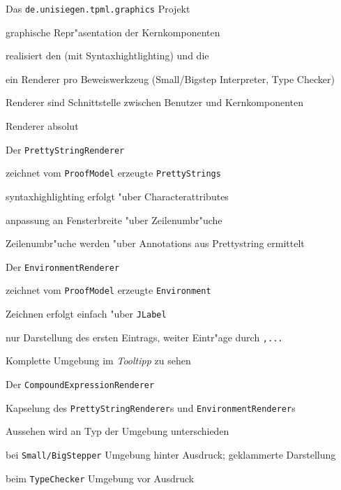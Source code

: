 
 {

  \begin{itemgroup}{Das {\tt de.unisiegen.tpml.graphics} Projekt}
    \item graphische Repr"asentation der Kernkomponenten
    \item realisiert den  (mit Syntaxhightlighting) und die 
    \item ein Renderer pro Beweiswerkzeug (Small/Bigstep Interpreter, Type Checker)
    \item Renderer sind Schnittstelle zwischen Benutzer und Kernkomponenten
    \item Renderer absolut 
  \end{itemgroup}
}



 {

  \begin{itemgroup} {Der {\tt PrettyStringRenderer} }
	  \item zeichnet vom {\tt ProofModel} erzeugte {\tt PrettyStrings}
    \item syntaxhighlighting erfolgt "uber Characterattributes
    \item anpassung an Fensterbreite "uber Zeilenumbr"uche
    \item Zeilenumbr"uche werden "uber Annotations aus Prettystring ermittelt
  \end{itemgroup}
}

 {
  \begin{itemgroup} {Der {\tt EnvironmentRenderer} }
    \item zeichnet vom {\tt ProofModel} erzeugte {\tt Environment}
    \item Zeichnen erfolgt einfach "uber {\tt JLabel}
    \item nur Darstellung des ersten Eintrags, weiter Eintr"age durch {\tt ,...}
    \item Komplette Umgebung im {\it Tooltipp} zu sehen
  \end{itemgroup}
}

 {
  \begin{itemgroup} {Der {\tt CompoundExpressionRenderer} }
    \item Kapselung des {\tt PrettyStringRenderer}s und {\tt EnvironmentRenderer}s
    \item Aussehen wird an Typ der Umgebung unterschieden 
    \begin {itemgroup} {}
      \item bei {\tt Small/BigStepper} Umgebung hinter Ausdruck; geklammerte Darstellung
      \item beim {\tt TypeChecker} Umgebung vor Ausdruck
    \end{itemgroup}
  \end{itemgroup}

}

